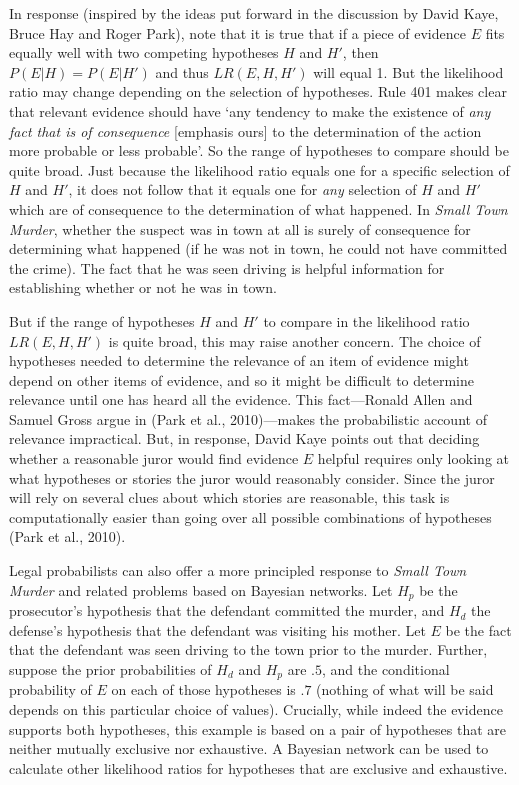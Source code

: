 \documentclass[10pt,dvipsnames,enabledeprecatedfontcommands]{scrartcl}
\begin{document}
In response (inspired by the ideas put forward in the discussion by
David Kaye, Bruce Hay and Roger Park), note that it is true that if a
piece of evidence \(E\) fits equally well with two competing hypotheses
\(H\) and \(H'\), then \(P(E\vert H)=P(E\vert H')\) and thus
\(LR(E,H,H')\) will equal 1. But the likelihood ratio may change
depending on the selection of hypotheses. Rule 401 makes clear that
relevant evidence should have `any tendency to make the existence of
\emph{any fact that is of consequence} {[}emphasis ours{]} to the
determination of the action more probable or less probable'. So the
range of hypotheses to compare should be quite broad. Just because the
likelihood ratio equals one for a specific selection of \(H\) and
\(H'\), it does not follow that it equals one for \textit{any} selection
of \(H\) and \(H'\) which are of consequence to the determination of
what happened. In \textit{Small Town Murder}, whether the suspect was in
town at all is surely of consequence for determining what happened (if
he was not in town, he could not have committed the crime). The fact
that he was seen driving is helpful information for establishing whether
or not he was in town.

But if the range of hypotheses \(H\) and \(H'\) to compare in the
likelihood ratio \(LR(E, H, H')\) is quite broad, this may raise another
concern. The choice of hypotheses needed to determine the relevance of
an item of evidence might depend on other items of evidence, and so it
might be difficult to determine relevance until one has heard all the
evidence. This fact---Ronald Allen and Samuel Gross argue in (Park et
al., 2010)---makes the probabilistic account of relevance impractical.
But, in response, David Kaye points out that deciding whether a
reasonable juror would find evidence \(E\) helpful requires only looking
at what hypotheses or stories the juror would reasonably consider. Since
the juror will rely on several clues about which stories are reasonable,
this task is computationally easier than going over all possible
combinations of hypotheses (Park et al., 2010).

Legal probabilists can also offer a more principled response to
\emph{Small Town Murder} and related problems based on Bayesian
networks. Let \(H_p\) be the prosecutor's hypothesis that the defendant
committed the murder, and \(H_d\) the defense's hypothesis that the
defendant was visiting his mother. Let \(E\) be the fact that the
defendant was seen driving to the town prior to the murder. Further,
suppose the prior probabilities of \(H_d\) and \(H_p\) are \(.5\), and
the conditional probability of \(E\) on each of those hypotheses is
\(.7\) (nothing of what will be said depends on this particular choice
of values). Crucially, while indeed the evidence supports both
hypotheses, this example is based on a pair of hypotheses that are
neither mutually exclusive nor exhaustive. A Bayesian network can be
used to calculate other likelihood ratios for hypotheses that are
exclusive and exhaustive.
\end{document}
